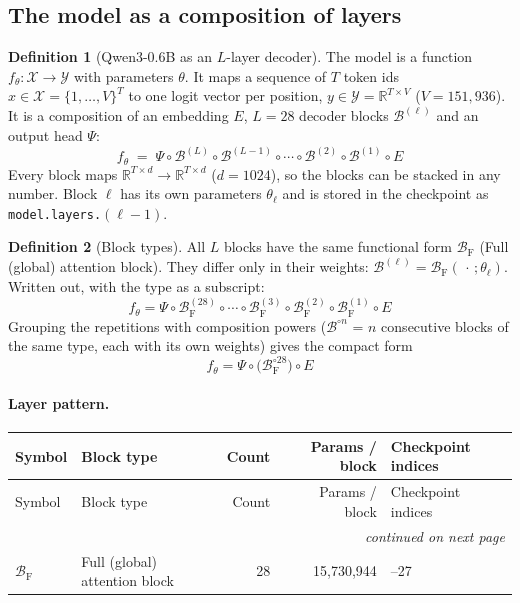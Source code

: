 \documentclass[10pt,a4paper]{article}
\theoremstyle{definition}
\newtheorem{definition}{Definition}[section]
\begin{document}
\subsection{The model as a composition of layers}\label{sec:comp}
\begin{definition}[Qwen3-0.6B as an $L$-layer decoder]
The model is a function $f_\theta:\mathcal{X}\to\mathcal{Y}$ with parameters $\theta$. It maps a sequence of $T$ token ids $x\in\mathcal{X}=\{1,\dots,V\}^{T}$ to one logit vector per position, $y\in\mathcal{Y}=\mathbb{R}^{T\times V}$ ($V=151{,}936$). It is a composition of an embedding $E$, $L=28$ decoder blocks $\mathcal{B}^{(\ell)}$ and an output head $\Psi$:
\begin{equation}
  f_\theta \;=\; \Psi\circ\mathcal{B}^{(L)}\circ\mathcal{B}^{(L-1)}\circ\cdots\circ\mathcal{B}^{(2)}\circ\mathcal{B}^{(1)}\circ E
\end{equation}
Every block maps $\mathbb{R}^{T\times d}\to\mathbb{R}^{T\times d}$ ($d=1024$), so the blocks can be stacked in any number. Block $\ell$ has its own parameters $\theta_\ell$ and is stored in the checkpoint as \texttt{model.layers.}$(\ell-1)$.
\end{definition}
\begin{definition}[Block types]
All $L$ blocks have the same functional form $\mathcal{B}_{\mathrm{F}}$ (Full (global) attention block). They differ only in their weights: $\mathcal{B}^{(\ell)}=\mathcal{B}_{\mathrm{F}}(\,\cdot\,;\theta_\ell)$.
Written out, with the type as a subscript:
\begin{equation}
  f_\theta = \Psi\circ \mathcal{B}^{(28)}_{\mathrm{F}}\circ \cdots\circ \mathcal{B}^{(3)}_{\mathrm{F}}\circ \mathcal{B}^{(2)}_{\mathrm{F}}\circ \mathcal{B}^{(1)}_{\mathrm{F}}\circ E
\end{equation}
Grouping the repetitions with composition powers ($\mathcal{B}^{\circ n}$ = $n$ consecutive blocks of the same type, each with its own weights) gives the compact form
\begin{equation}\label{eq:compact}
  f_\theta = \Psi\circ\Big(\mathcal{B}_{\mathrm{F}}^{\circ 28}\Big)\circ E
\end{equation}
\end{definition}
\paragraph{Layer pattern.}
\begin{longtable}{l>{\raggedright\arraybackslash}p{5.6cm}rr>{\raggedright\arraybackslash}p{4.4cm}}
\toprule
Symbol & Block type & Count & Params / block & Checkpoint indices \\
\midrule
\endfirsthead
\toprule
Symbol & Block type & Count & Params / block & Checkpoint indices \\
\midrule
\endhead
\midrule \multicolumn{5}{r}{\textit{continued on next page}} \\
\endfoot
\bottomrule
\endlastfoot
$\mathcal{B}_{\mathrm{F}}$ & Full (global) attention block & 28 & 15,730,944 & 0--27 \\
\end{longtable}
\end{document}
